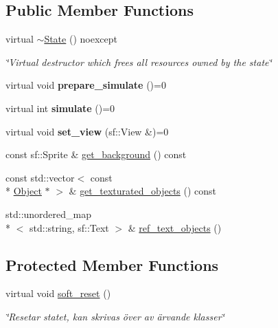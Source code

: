 \subsection*{Public Member Functions}
\begin{DoxyCompactItemize}
\item 
\hypertarget{classState_a591f523d68d09675b3bd6f8e1084e642}{virtual \hyperlink{classState_a591f523d68d09675b3bd6f8e1084e642}{$\sim$\+State} () noexcept}\label{classState_a591f523d68d09675b3bd6f8e1084e642}

\begin{DoxyCompactList}\small\item\em \char`\"{}\+Virtual destructor which frees all resources owned by the state\char`\"{} \end{DoxyCompactList}\item 
\hypertarget{classState_af0cf4ef9c4b4e9a22dacf949f3df8cea}{virtual void {\bfseries prepare\+\_\+simulate} ()=0}\label{classState_af0cf4ef9c4b4e9a22dacf949f3df8cea}

\item 
\hypertarget{classState_a2fd001147b34d4a07102ba0acf680982}{virtual int {\bfseries simulate} ()=0}\label{classState_a2fd001147b34d4a07102ba0acf680982}

\item 
\hypertarget{classState_aacfda33b8dc4e6d39febdb192270a85a}{virtual void {\bfseries set\+\_\+view} (sf\+::\+View \&)=0}\label{classState_aacfda33b8dc4e6d39febdb192270a85a}

\item 
const sf\+::\+Sprite \& \hyperlink{classState_a9e132079dc08365e3c30633dd002ab8c}{get\+\_\+background} () const 
\item 
const std\+::vector$<$ const \\*
\hyperlink{classObject}{Object} $\ast$ $>$ \& \hyperlink{classState_aa234d5b01d5f75580825ea0e38074482}{get\+\_\+texturated\+\_\+objects} () const 
\item 
std\+::unordered\+\_\+map\\*
$<$ std\+::string, sf\+::\+Text $>$ \& \hyperlink{classState_a38fe48726722d318d346608f4f947121}{ref\+\_\+text\+\_\+objects} ()
\end{DoxyCompactItemize}
\subsection*{Protected Member Functions}
\begin{DoxyCompactItemize}
\item 
\hypertarget{classState_a2ebdd6e26d78ad2d34a8bf14ddb7ccf3}{virtual void \hyperlink{classState_a2ebdd6e26d78ad2d34a8bf14ddb7ccf3}{soft\+\_\+reset} ()}\label{classState_a2ebdd6e26d78ad2d34a8bf14ddb7ccf3}

\begin{DoxyCompactList}\small\item\em \char`\"{}\+Resetar statet, kan skrivas över av ärvande klasser\char`\"{} \end{DoxyCompactList}\end{DoxyCompactItemize}
